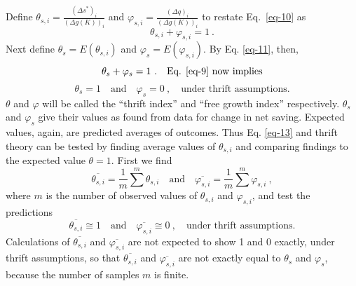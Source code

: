 \documentclass[a4paper,fleqn]{latex_styles/cas-sc}
\begin{document}
%

%
\FloatBarrier

\FloatBarrier
%
%
Define \(\theta_{s,i} = \frac{(\Delta s^{*})_{i}}{(\Delta g{(K)})_{i}}\)
and \(\varphi_{s,i} = \frac{(\Delta q)_{i}}{(\Delta g{(K)})_{i}}\) to
restate Eq.~\eqref{eq-10} as
%
\begin{equation}
\theta_{s,i} + \varphi_{s,i} = 1 \ .\label{eq-11}
\end{equation}
%
Next define \(\theta_s = E(\theta_{s,i})\) and \(\varphi_s = E(\varphi_{s,i})\). By Eq. \eqref{eq-11}, then,
%
\begin{equation}%
    \theta_s + \varphi_s = 1 \ . \quad \text{Eq. \eqref{eq-9} now implies}%
    \label{eq-12}%
\end{equation}%
%
\vspace{-5ex}%
%
\begin{equation}%
    \theta_s = 1 \quad \text{and} \quad \varphi_s = 0 \ , \quad \text{under thrift assumptions.}%
    \label{eq-13}%
\end{equation}%
%
\(\theta\) and \(\varphi\) will be called the ``thrift index'' and
``free growth index'' respectively. \(\theta_{s}\) and
\(\varphi_{s}\) give their values as found from data for change in net
saving. 
%
Expected values, again, are predicted averages of outcomes. Thus Eq. \eqref{eq-13} and thrift theory can be tested by finding average values of \(\theta_{s,i}\) and comparing findings to the expected value \(\theta = 1\). First we find
%
%
\[\overline{\theta_{s,i}} = \frac{1}{m} \sum^{m} \theta_{s,i} \quad \text{and} \quad
\overline{\varphi_{s,i}} = \frac{1}{m} \sum^{m} \varphi_{s,i}\ ,\]
%
where \(m\) is the number of observed values of \(\theta_{s,i}\) and
\(\varphi_{s,i}\), and test the predictions
\[
\overline{\theta_{s,i}} \cong 1 \quad \text{and} \quad \overline{\varphi_{s,i}} \cong 0\ , \quad \text{under thrift assumptions.}
\]
%
Calculations of \(\overline{\theta_{s,i}}\) and
\(\overline{\varphi_{s,i}}\) are not expected to show 1 and 0 exactly,
under thrift assumptions, so that \(\overline{\theta_{s,i}}\) and \(\overline{\varphi_{s,i}}\) are not exactly equal to \(\theta_s\) and \(\varphi_s\), because the number of samples \(m\) is finite.
\end{document}

